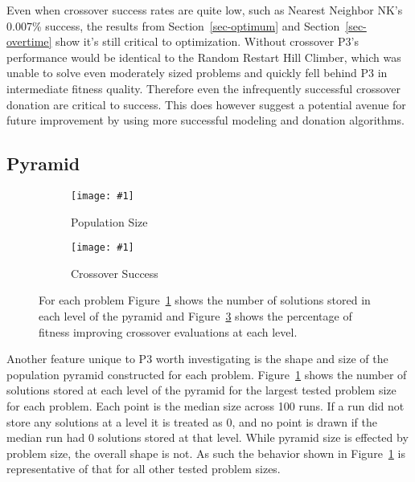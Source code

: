 \documentclass[twoside]{article}
\newcommand{\includegraphicsfit}[1]
{\texttt{[image: \#1]}}
\begin{document}
Even when crossover success rates are quite low, such as Nearest Neighbor NK's 0.007\% success,
the results from Section~\ref{sec-optimum} and Section~\ref{sec-overtime} show it's still critical to optimization. Without
crossover P3's performance would be identical to the Random Restart Hill Climber, which was unable to solve even moderately sized problems
and quickly fell behind P3 in intermediate fitness quality. Therefore even the infrequently successful crossover donation are
critical to success. This does however suggest a potential avenue for future improvement by using more successful
modeling and donation algorithms.

\subsection{Pyramid}
\begin{figure}[t]
  \begin{centering}
    \begin{subfigure}{.5\textwidth}
      \begin{centering}
        \includegraphicsfit{level-size}
      \end{centering}
      \caption{Population Size}
      \label{fig-level-size}
    \end{subfigure}%
    \begin{subfigure}{.5\textwidth}
      \begin{centering}
        \includegraphicsfit{level-success}
      \end{centering}
      \caption{Crossover Success}
      \label{fig-level-success}
    \end{subfigure}
  \end{centering}
  \caption{For each problem Figure~\ref{fig-level-size} shows the number of solutions stored in each level of the pyramid
           and Figure~\ref{fig-level-success} shows the percentage of fitness improving crossover evaluations at each level.}
\end{figure}

Another feature unique to P3 worth investigating is the shape and size of the population pyramid
constructed for each problem. Figure~\ref{fig-level-size} shows the number of solutions stored at
each level of the pyramid for the largest tested problem size for each problem. Each point is the
median size across 100 runs. If a run did not store any solutions at a level it is treated as 0,
and no point is drawn if the median run had 0 solutions stored at that level. While pyramid size
is effected by problem size, the overall shape is not. As such the behavior shown in Figure~\ref{fig-level-size}
is representative of that for all other tested problem sizes.
\end{document}
